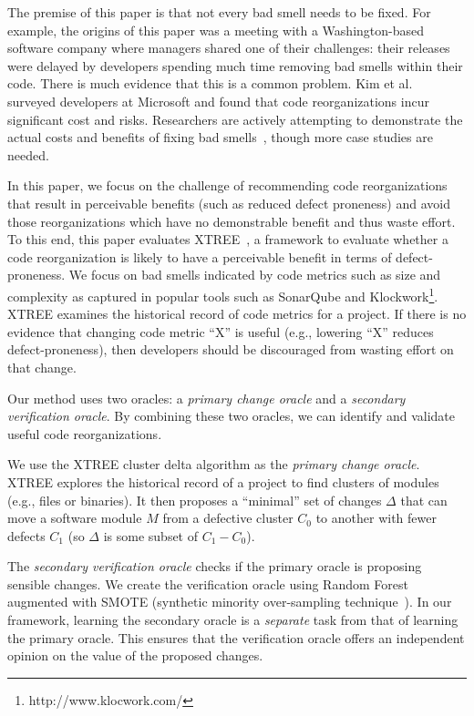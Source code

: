 \documentclass[twocolumn,5p]{elsarticle}
\theoremstyle{break}
\begin{document}
	The premise of this paper is that not every bad smell needs to be fixed.
        For example, 
	the origins of this paper was a meeting with a  Washington-based software company where managers
        shared one of 
	their challenges: their  releases were delayed by 
	developers spending  much time removing bad smells within their code. There is much evidence
        that this is a common problem. Kim 
	et al.~\cite{kim2012field} surveyed developers at Microsoft and found that 
	code reorganizations incur significant cost and risks. Researchers are 
	actively attempting to demonstrate the actual costs and benefits of fixing 
	bad 
	smells~\cite{nugroho2011empirical,zazworka2011prioritizing,zazworka2013case},
	 though more case studies are needed.
	
	 In this 
	paper, we focus on the challenge of recommending code reorganizations that 
	result in perceivable benefits (such as reduced defect proneness) and avoid 
	those reorganizations which have no demonstrable benefit and thus waste 
	effort.
	 To this end, this
	paper evaluates XTREE~\cite{krishna2015actionable}, a framework to evaluate 
	whether a code reorganization is likely to have a perceivable benefit in 
	terms of defect-proneness. We focus on bad smells indicated by code 
	metrics 
	such as size and complexity as captured in popular tools such as SonarQube 
	and Klockwork\footnote{http://www.klocwork.com/}.
	XTREE examines the historical record of code metrics for a project. If 
	there is no evidence that changing code metric ``X'' is useful (e.g., 
	lowering ``X'' reduces defect-proneness), then developers should be 
	discouraged from wasting effort on that change.
	
	Our method uses two oracles: a {\em primary
		change oracle} and a {\em secondary verification oracle}.
	By combining these two oracles,
	we can identify and validate useful
	code reorganizations.
	
	We use
	the XTREE cluster delta algorithm as the {\em primary change  oracle}.
	XTREE
	explores the historical record of a project to find clusters of modules 
	(e.g., files or binaries).
	It then proposes a ``minimal'' set of changes $\Delta$ that can move a 
	software module $M$ from a defective cluster $C_0$ to another with fewer 
	defects $C_1$ (so $\Delta$
	is some subset of $C_1 - C_0$). %
	
	The {\em secondary verification oracle} checks if the primary oracle is 
	proposing
	sensible changes. We create the verification oracle using Random 
	Forest~\cite{Breiman2001} augmented with SMOTE (synthetic  minority 
	over-sampling technique~\cite{chawla2002smote}).
	In our framework,  learning
	the secondary oracle is   a {\em separate} task from that of learning the 
	primary
	oracle. This  ensures that the verification oracle offers an independent
	opinion on the value of the proposed changes.
	
\end{document}
